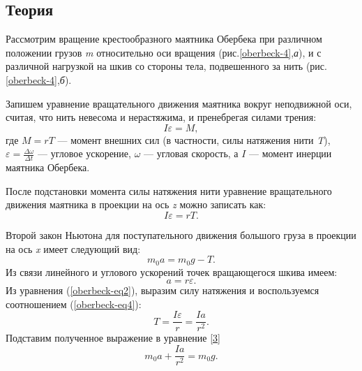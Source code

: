 \documentclass[All.tex]{subfiles}
\begin{document}
	\subsection*{\textcolor{PineGreen}{Теория}}
	
Рассмотрим вращение крестообразного маятника Обербека при различном положении грузов \textit{m} относительно оси вращения (рис.\ref{oberbeck-4},\textit{а}), и с различной нагрузкой на шкив со стороны тела, подвешенного за нить (рис.\ref{oberbeck-4},\textit{б}). 
	
Запишем уравнение вращательного движения маятника вокруг неподвижной оси, считая, что нить невесома и нерастяжима, и пренебрегая силами трения:
\begin{equation}\label{oberbeck-eq1}
	I\varepsilon = M,
\end{equation}
где $ M=rT $ — момент внешних сил (в частности, силы натяжения нити \textit{T}), $ \varepsilon = \frac{\Delta\omega}{\Delta t} $ — угловое ускорение, $ \omega $ — угловая скорость, а $ I $ — момент инерции маятника Обербека.


	После подстановки момента силы натяжения нити уравнение вращательного движения маятника в проекции на ось \textit{z} можно записать как:
	\begin{equation}\label{oberbeck-eq2}
	I\varepsilon = rT. 
	\end{equation}


	Второй закон Ньютона для поступательного движения большого груза в проекции на ось \textit{x} имеет следующий вид:
	\begin{equation}\label{oberbeck-eq3}
	m_0a = m_0g - T.
	\end{equation}
	Из связи линейного и углового ускорений точек вращающегося шкива имеем:
	\begin{equation}\label{oberbeck-eq4}
	a = r\varepsilon.
	\end{equation}
	Из уравнения (\ref{oberbeck-eq2}), выразим силу натяжения и воспользуемся соотношением (\ref{oberbeck-eq4}):
	\begin{equation}\label{oberbeck-eq5}
	T = \frac{I\varepsilon}{r} = \frac{Ia}{r^{2}}.
	\end{equation}
	Подставим полученное выражение в уравнение \ref{3}
	\begin{equation}\label{oberbeck-eq6}
	m_0a + \frac{Ia}{r^{2}} = m_0g.
	\end{equation}
	
\end{document}
